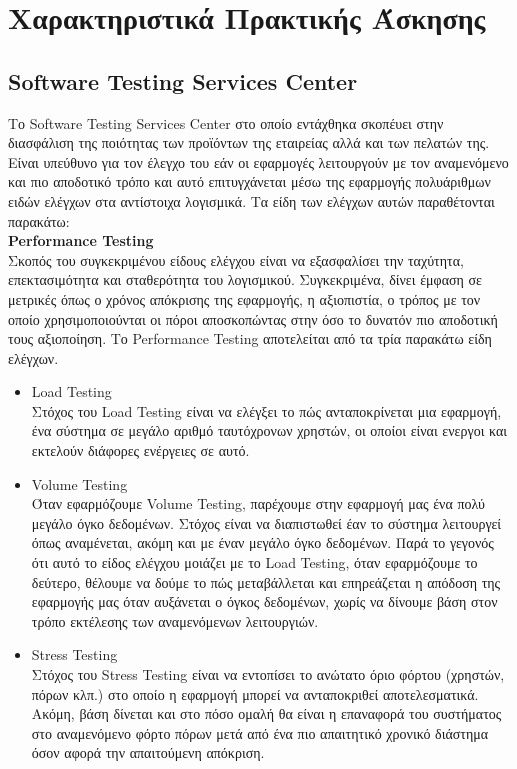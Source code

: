 \chapter*{Χαρακτηριστικά Πρακτικής Άσκησης}

\section*{Software Testing Services Center}

Το Software Testing Services Center στο οποίο εντάχθηκα σκοπέυει στην διασφάλιση της ποιότητας των προϊόντων της εταιρείας αλλά και των πελατών της. Είναι υπεύθυνο για τον έλεγχο του εάν οι εφαρμογές λειτουργούν με τον αναμενόμενο και πιο αποδοτικό τρόπο και αυτό επιτυγχάνεται μέσω της εφαρμογής πολυάριθμων ειδών ελέγχων στα αντίστοιχα λογισμικά. Τα είδη των ελέγχων αυτών παραθέτονται παρακάτω:\\

\textbf{Performance Testing}\\
Σκοπός του συγκεκριμένου είδους ελέγχου είναι να εξασφαλίσει την ταχύτητα, επεκτασιμότητα και σταθερότητα του λογισμικού. Συγκεκριμένα, δίνει έμφαση σε μετρικές όπως ο χρόνος απόκρισης της εφαρμογής, η αξιοπιστία, ο τρόπος με τον οποίο χρησιμοποιούνται οι πόροι αποσκοπώντας στην όσο το δυνατόν πιο αποδοτική τους αξιοποίηση. Το Performance Testing αποτελείται από τα τρία παρακάτω είδη ελέγχων.

\begin{itemize}
    \item Load Testing\\
    Στόχος του Load Testing είναι να ελέγξει το πώς ανταποκρίνεται μια εφαρμογή, ένα σύστημα σε μεγάλο αριθμό ταυτόχρονων χρηστών, οι οποίοι είναι ενεργοι και εκτελούν διάφορες ενέργειες σε αυτό.
    \item Volume Testing\\
    Όταν εφαρμόζουμε Volume Testing, παρέχουμε στην εφαρμογή μας ένα πολύ μεγάλο όγκο δεδομένων. Στόχος είναι να διαπιστωθεί έαν το σύστημα λειτουργεί όπως αναμένεται, ακόμη και με έναν μεγάλο όγκο δεδομένων. Παρά το γεγονός ότι αυτό το είδος ελέγχου μοιάζει με το Load Testing, όταν εφαρμόζουμε το δεύτερο, θέλουμε να δούμε το πώς μεταβάλλεται και επηρεάζεται η απόδοση της εφαρμογής μας όταν αυξάνεται ο όγκος δεδομένων, χωρίς να δίνουμε βάση στον τρόπο εκτέλεσης των αναμενόμενων λειτουργιών.
    \item Stress Testing\\
    Στόχος του Stress Testing είναι να εντοπίσει το ανώτατο όριο φόρτου (χρηστών, πόρων κλπ.) στο οποίο η εφαρμογή μπορεί να ανταποκριθεί αποτελεσματικά. Ακόμη, βάση δίνεται και στο πόσο ομαλή θα είναι η επαναφορά του συστήματος στο αναμενόμενο φόρτο πόρων μετά από ένα πιο απαιτητικό χρονικό διάστημα όσον αφορά την απαιτούμενη απόκριση. \\
\end{itemize}

